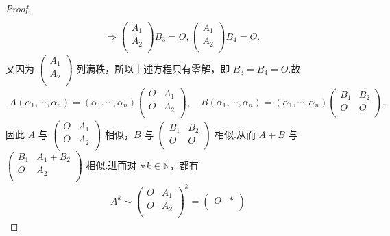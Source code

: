 \documentclass[../../main.tex]{subfiles}%
\begin{document}
\begin{proof}
\begin{align*}
\\
&\Longrightarrow \begin{pmatrix}
A_1\\
A_2\\
\end{pmatrix} B_3=O,\begin{pmatrix}
A_1\\
A_2\\
\end{pmatrix} B_4=O.
\end{align*}
又因为 $\begin{pmatrix}
A_1\\
A_2\\
\end{pmatrix}$ 列满秩，所以上述方程只有零解，即 $B_3=B_4=O$.故
\begin{align*}
A\left( \alpha _1,\cdots ,\alpha _n \right) =\left( \alpha _1,\cdots ,\alpha _n \right) \begin{pmatrix}
O&		A_1\\
O&		A_2\\
\end{pmatrix}, \quad B\left( \alpha _1,\cdots ,\alpha _n \right) =\left( \alpha _1,\cdots ,\alpha _n \right) \begin{pmatrix}
B_1&		B_2\\
O&		O\\
\end{pmatrix}.
\end{align*}
因此 $A$ 与 $\begin{pmatrix}
O&		A_1\\
O&		A_2\\
\end{pmatrix}$ 相似，$B$ 与 $\begin{pmatrix}
B_1&		B_2\\
O&		O\\
\end{pmatrix}$ 相似.从而 $A+B$ 与 $\begin{pmatrix}
B_1&		A_1+B_2\\
O&		A_2\\
\end{pmatrix}$ 相似.进而对 $\forall k\in \mathbb{N}$，都有
\begin{align*}
A^k\sim \begin{pmatrix}
O&		A_1\\
O&		A_2\\
\end{pmatrix} ^k=\begin{pmatrix}
O&		*\\

\end{pmatrix}
\end{align*}
\end{proof}
\end{document}
